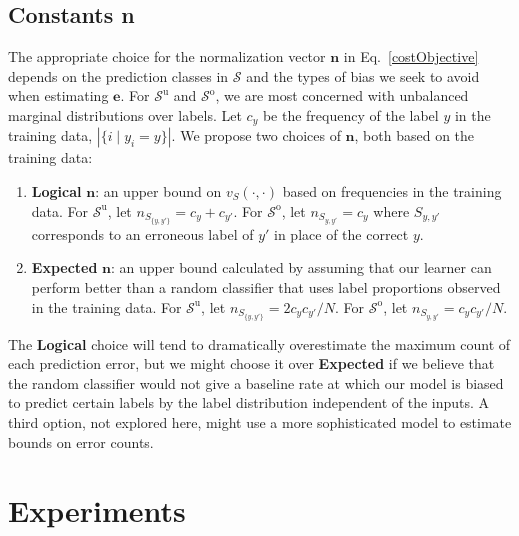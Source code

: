 \documentclass{article} %
\newcommand{\unorderedS}{\mathcal{S}^{\mathrm{u}}}
\newcommand{\orderedS}{\mathcal{S}^{\mathrm{o}}}
\begin{document}
\subsection{Constants \textbf{n}}

The appropriate choice for the normalization vector $\mathbf{n}$ in 
Eq.~\ref{costObjective} depends on the prediction classes in
$\mathcal{S}$ and the types of bias we seek to avoid when estimating $\mathbf{e}$.
For $\unorderedS$ and $\orderedS$, we are most concerned with
unbalanced marginal distributions over labels.  
Let $c_y$ be the frequency of the label $y$ in the training data,
$|\{i \mid y_i = y\}|$.
We propose two choices
of $\mathbf{n}$, both based on the training data:
\begin{enumerate}
\item \textbf{Logical} $\mathbf{n}$:  an upper bound on $v_S(\cdot,
  \cdot)$ based on frequencies in the training data.  For $\unorderedS$, let
  $n_{S_{\{y,y'\}}} = c_y+c_{y'}$.  For
  $\orderedS$, let $n_{S_{y, y'}} = c_y$ where
  $S_{y,y'}$ corresponds to an erroneous label of $y'$ in place of the
  correct $y$.
\item \textbf{Expected} $\mathbf{n}$:  an upper bound calculated by
  assuming that our learner can perform better than a random
  classifier that uses label proportions observed in the training
  data.    For $\unorderedS$, let $n_{S_{\{y,y'\}}} = 2c_y c_{y'} / N$.  For
  $\orderedS$, let $n_{S_{y,y'}} =  c_y c_{y'} / N$. 
\end{enumerate}

 The \textbf{Logical} choice
will tend to dramatically overestimate the maximum count of each
prediction error,
but we might choose it over \textbf{Expected} if we
believe that the random classifier would not give a baseline rate at
which our model is biased to predict certain labels by the label
distribution independent of the inputs.
A third option, not explored here, might use a more sophisticated
model to estimate bounds on error counts.

\section{Experiments}
\end{document}
